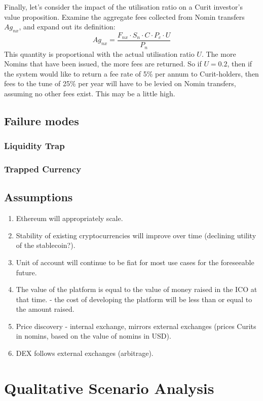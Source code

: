 \documentclass{article}
\begin{document}
\noindent Finally, let's consider the impact of the utilisation ratio on a Curit investor's value proposition. Examine the aggregate fees collected from Nomin transfers \(Ag_{nx}\), and expand out its definition:
\[Ag_{nx} = \frac{F_{nx} \cdot S_n \cdot C \cdot P_c \cdot U}{P_n}\]
This quantity is proportional with the actual utilisation ratio \(U\). The more Nomins that have been issued, the more fees are returned. So if \(U = 0.2\), then if the system would like to return a fee rate of 5\% per annum to Curit-holders, then fees to the tune of 25\% per year will have to be levied on Nomin transfers, assuming no other fees exist. This may be a little high.

\pagebreak
\subsection{Failure modes}
\subsubsection{Liquidity Trap}
\subsubsection{Trapped Currency}

\subsection{Assumptions}

\begin{enumerate}
	\item Ethereum will appropriately scale.
	\item Stability of existing cryptocurrencies will improve over time (declining utility of the stablecoin?).
	\item Unit of account will continue to be fiat for most use cases for the foreseeable future.
	\item The value of the platform is equal to the value of money raised in the ICO at that time.
   - the cost of developing the platform will be less than or equal to the amount raised.
	\item Price discovery - internal exchange, mirrors external exchanges (prices Curits in nomins, based on the value of nomins in USD).
	\item DEX follows external exchanges (arbitrage).
\end{enumerate}

\pagebreak
\section{Qualitative Scenario Analysis}
\end{document}
